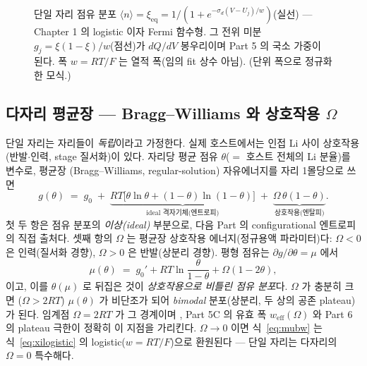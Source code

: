 \documentclass[11pt,a4paper]{article}
\newcommand{\eq}{\mathrm{eq}}
\newcommand{\eff}{\mathrm{eff}}
\begin{document}
\begin{figure}[t]
\centering
{}
\caption{단일 자리 점유 분포 $\langle n\rangle=\xi_{\eq}=1/(1+e^{-\sigma_d(V-U_j)/w})$(실선) — Chapter 1
의 logistic 이자 Fermi 함수형. 그 전위 미분 $g_j=\xi(1-\xi)/w$(점선)가 $dQ/dV$ 봉우리이며 Part 5 의 국소
가중이 된다. 폭 $w=RT/F$ 는 열적 폭(임의 fit 상수 아님). (단위 폭으로 정규화한 모식.)}
\label{fig:occupation}
\end{figure}

\subsection{다자리 평균장 — Bragg--Williams 와 상호작용 $\Omega$}\label{sec:bw}
단일 자리는 자리들이 \emph{독립}이라고 가정한다. 실제 호스트에서는 인접 Li 사이 상호작용(반발$\cdot$인력,
stage 질서화)이 있다. 자리당 평균 점유 $\theta$($=$ 호스트 전체의 Li 분율)를 변수로, 평균장
(Bragg--Williams, regular-solution) 자유에너지를 자리 1몰당으로 쓰면 \cite{bazant2013,huggins2009}
\begin{equation}
g(\theta) \;=\; g_0 \;+\; \underbrace{RT\big[\theta\ln\theta+(1-\theta)\ln(1-\theta)\big]}_{\text{ideal 격자기체(엔트로피)}}
\;+\; \underbrace{\Omega\,\theta(1-\theta)}_{\text{상호작용(엔탈피)}}.
\label{eq:bw}
\end{equation}
첫 두 항은 점유 분포의 \emph{이상(ideal)} 부분으로, 다음 Part 의 configurational 엔트로피의 직접 출처다.
셋째 항의 $\Omega$ 는 평균장 상호작용 에너지(정규용액 파라미터)다: $\Omega<0$ 은 인력(질서화 경향),
$\Omega>0$ 은 반발(상분리 경향). 평형 점유는 $\partial g/\partial\theta=\mu$ 에서
\begin{equation}
\mu(\theta) \;=\; g_0' + RT\ln\frac{\theta}{1-\theta} + \Omega(1-2\theta),
\label{eq:mubw}
\end{equation}
이고, 이를 $\theta(\mu)$ 로 뒤집은 것이 \emph{상호작용으로 비틀린 점유 분포}다. $\Omega$ 가 충분히 크면
($\Omega>2RT$) $\mu(\theta)$ 가 비단조가 되어 \emph{bimodal} 분포(상분리, 두 상의 공존 plateau)가 된다.
임계점 $\Omega=2RT$ 가 그 경계이며 \cite{bazant2013}, Part 5C 의 유효 폭 $w_\eff(\Omega)$ 와 Part 6 의
plateau 극한이 정확히 이 지점을 가리킨다. $\Omega\to0$ 이면 식~\eqref{eq:mubw} 는 식~\eqref{eq:xilogistic}
의 logistic($w=RT/F$)으로 환원된다 — 단일 자리는 다자리의 $\Omega=0$ 특수해다.
\end{document}
